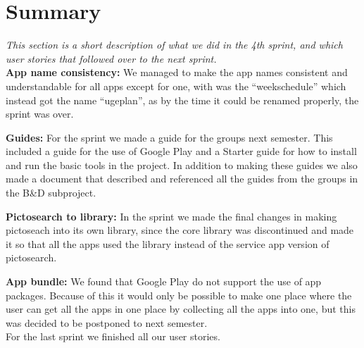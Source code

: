 \section{Summary} 
\textit{This section is a short description of what we did in the 4th sprint, and which user stories that followed over to the next sprint.}\\

\textbf{App name consistency:}
We managed to make the app names consistent and understandable for all apps except for one, with was the “weekschedule” which instead got the name “ugeplan”, as by the time it could be renamed properly, the sprint was over.

\textbf{Guides:}
For the sprint we made a guide for the groups next semester. This included a guide for the use of Google Play and a Starter guide for how to install and run the basic tools in the project. In addition to making these guides we also made a document that described and referenced all the guides from the groups in the B\&D subproject.

\textbf{Pictosearch to library:}
In the sprint we made the final changes in making pictoseach into its own library, since the core library was discontinued and made it so that all the apps used the library instead of the service app version of pictosearch.

\textbf{App bundle:}
We found that Google Play do not support the use of app packages. Because of this it would only be possible to make one place where the user can get all the apps in one place by collecting all the apps into one, but this was decided to be postponed to next semester.\\

For the last sprint we finished all our user stories.

